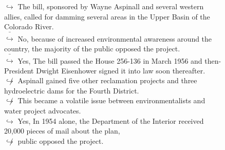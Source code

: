 \documentclass[11pt,a4paper, onecolumn]{article}
\begin{document}
\begin{figure}[t] \small \begin{tcolorbox}[boxsep=0pt,left=5pt,right=0pt,top=2pt,colback = yellow!5] \begin{dialogue}
 \small 
\colorbox{pink!25}{$\hookrightarrow$}
{ The bill, sponsored by Wayne Aspinall and several western allies, called for damming several areas in the Upper Basin of the Colorado River. }
\\
\colorbox{pink!25}{ $\bar{\hookrightarrow}$}
\colorbox{red!25}{No,}
{ because of increased environmental awareness around the country, the majority of the public opposed the project. }
\\
\colorbox{pink!25}{ $\bar{\hookrightarrow}$}
\colorbox{red!25}{Yes,}
{ The bill passed the House 256-136 in March 1956 and then-President Dwight Eisenhower signed it into law soon thereafter. }
\\
\colorbox{pink!25}{$\not\hookrightarrow$}
{ Aspinall gained five other reclamation projects and three hydroelectric dams for the Fourth District. }
\\
\colorbox{pink!25}{$\not\hookrightarrow$}
{ This became a volatile issue between environmentalists and water project advocates. }
\\
\colorbox{pink!25}{$\hookrightarrow$}
\colorbox{red!25}{Yes,}
{ In 1954 alone, the Department of the Interior received 20,000 pieces of mail about the plan, }
\\
\colorbox{pink!25}{$\not\hookrightarrow$}
{ public opposed the project. }
\\
 \end{dialogue}\end{tcolorbox}\end{figure}
\end{document}
